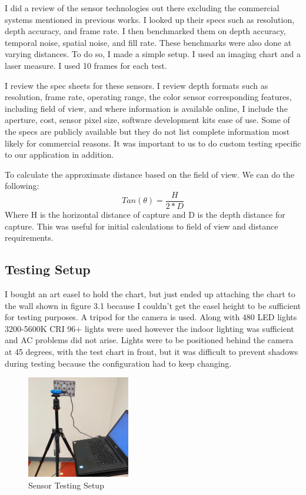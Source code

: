 I did a review of the sensor technologies out there excluding the commercial systems mentioned in previous works. I looked up their specs such as resolution, depth accuracy, and frame rate. I then benchmarked them on depth accuracy, temporal noise, spatial noise, and fill rate. These benchmarks were also done at varying distances. To do so, I made a simple setup. I used an imaging chart and a laser measure. I used 10 frames for each test.

I review the spec sheets for these sensors. I review depth formats such as resolution, frame rate, operating range, the color sensor corresponding features, including field of view, and where information is available online, I include the aperture, cost, sensor pixel size, software development kits ease of use.
Some of the specs are publicly available but they do not list complete information most likely for commercial reasons. It was important to us to do custom testing specific to our application in addition.

To calculate the approximate distance based on the field of view. We can do the following:
\begin{equation}
	Tan(\theta) = \frac{H}{2 * D}
\end{equation}
Where H is the horizontal distance of capture and D is the depth distance for capture. This was useful for initial calculations to field of view and distance requirements.
\subsection{Testing Setup}
I bought an art easel to hold the chart, but just ended up attaching the chart to the wall shown in figure 3.1 because I couldn't get the easel height to be sufficient for testing purposes. A tripod for the camera is used. Along with 480 LED lights 3200-5600K CRI 96+ lights were used however the indoor lighting was sufficient and AC problems did not arise. Lights were to be positioned behind the camera at 45 degrees, with the test chart in front, but it was difficult to prevent shadows during testing because the configuration had to keep changing. 
\begin{figure}[!htb]
	\caption{Sensor Testing Setup}
	\centering
	\includegraphics[width=0.4\textwidth, angle=0]{images/sensor_testing.png}
\end{figure}


